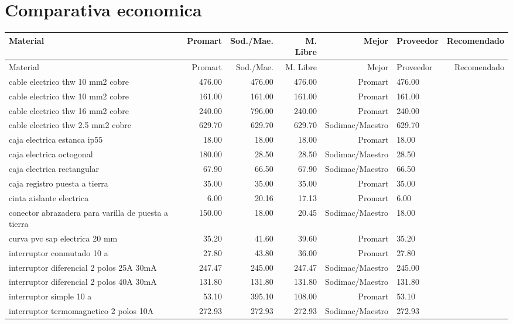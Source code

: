 \section{Comparativa economica}
\begin{landscape}\scriptsize\begin{longtable}{p{7.2cm}rrrrp{3.0cm}r}
\toprule Material & Promart & Sod./Mae. & M. Libre & Mejor & Proveedor & Recomendado \\ \midrule
\endfirsthead\toprule Material & Promart & Sod./Mae. & M. Libre & Mejor & Proveedor & Recomendado \\ \midrule\endhead
cable electrico thw 10 mm2 cobre & 476.00 & 476.00 & 476.00 & Promart & 476.00 \\
cable electrico thw 10 mm2 cobre & 161.00 & 161.00 & 161.00 & Promart & 161.00 \\
cable electrico thw 16 mm2 cobre & 240.00 & 796.00 & 240.00 & Promart & 240.00 \\
cable electrico thw 2.5 mm2 cobre & 629.70 & 629.70 & 629.70 & Sodimac/Maestro & 629.70 \\
caja electrica estanca ip55 & 18.00 & 18.00 & 18.00 & Promart & 18.00 \\
caja electrica octogonal & 180.00 & 28.50 & 28.50 & Sodimac/Maestro & 28.50 \\
caja electrica rectangular & 67.90 & 66.50 & 67.90 & Sodimac/Maestro & 66.50 \\
caja registro puesta a tierra & 35.00 & 35.00 & 35.00 & Promart & 35.00 \\
cinta aislante electrica & 6.00 & 20.16 & 17.13 & Promart & 6.00 \\
conector abrazadera para varilla de puesta a tierra & 150.00 & 18.00 & 20.45 & Sodimac/Maestro & 18.00 \\
curva pvc sap electrica 20 mm & 35.20 & 41.60 & 39.60 & Promart & 35.20 \\
interruptor conmutado 10 a & 27.80 & 43.80 & 36.00 & Promart & 27.80 \\
interruptor diferencial 2 polos 25A 30mA & 247.47 & 245.00 & 247.47 & Sodimac/Maestro & 245.00 \\
interruptor diferencial 2 polos 40A 30mA & 131.80 & 131.80 & 131.80 & Sodimac/Maestro & 131.80 \\
interruptor simple 10 a & 53.10 & 395.10 & 108.00 & Promart & 53.10 \\
interruptor termomagnetico 2 polos 10A & 272.93 & 272.93 & 272.93 & Sodimac/Maestro & 272.93 \\

\end{longtable}
\end{landscape}
